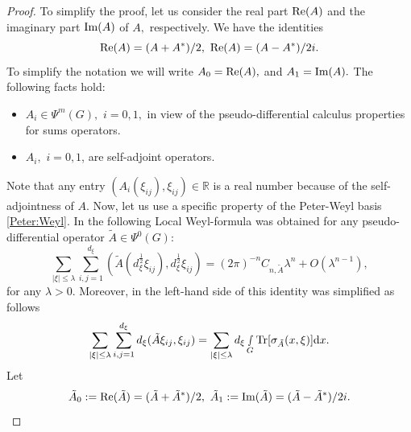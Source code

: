 \documentclass[12pt, reqno]{amsart}
\theoremstyle{definition}
\theoremstyle{remark}
\numberwithin{equation}{section}
\begin{document}
\begin{proof}
To simplify the proof, let us consider the real part $\textnormal{Re}(A)$ and the imaginary part $\textnormal{Im}(A)$ of $A,$ respectively. We have the identities
 \begin{equation}
        \textnormal{Re}(A)=(A+A^{*})/2,\,\,\textnormal{Re}(A)=(A-A^{*})/2i.
    \end{equation}To simplify the notation we will write $A_{0}=\textnormal{Re}(A),$ and  $A_{1}=\textnormal{Im}(A).$ 
The following facts hold:
\begin{itemize}
    \item $A_{i}\in \Psi^m(G),$ $i=0,1,$ in view of the pseudo-differential calculus properties for sums operators.
    \item $A_{i},$ $i=0,1$, are self-adjoint operators.
\end{itemize}Note that any entry $(A_{i}(\xi_{ij}),\xi_{ij})\in \mathbb{R
}$ is a real number because of the self-adjointness of $A.$ Now, let us use a specific property of the Peter-Weyl basis \eqref{Peter:Weyl}. 
In \cite{CardonaDelgadoRuzhanksyLOcalWeyl}
the following Local Weyl-formula was obtained for any pseudo-differential operator $\tilde{A}\in \Psi^0(G):$
\begin{equation}\label{Preliminary:formula}
  \sum_{|\xi|\leq \lambda}  \sum_{i,j=1}^{d_\xi}(\tilde{A}(d_\xi^{\frac{1}{2}}\xi_{ij}),d_\xi^{\frac{1}{2}}\xi_{ij})= (2\pi)^{-n}C_{n,\tilde A}\lambda^n+O(\lambda^{n-1}),
\end{equation}for any $\lambda>0.$ Moreover, in \cite{CardonaDelgadoRuzhanksyLOcalWeyl} the left-hand side of this identity was simplified as follows
\begin{equation}\label{equality}
    \sum_{|\xi|\leq \lambda}  \sum_{i,j=1}^{d_\xi}d_\xi(\tilde A\xi_{ij},\xi_{ij})=  \sum_{|\xi|\leq \lambda}d_\xi\smallint\limits_{G}\textnormal{Tr}[\sigma_{\tilde A}(x,\xi)]\textnormal{d}x.
\end{equation}Let \begin{equation}
       \tilde A_{0}:= \textnormal{Re}(\tilde A)=(\tilde A+{\tilde A}^{*})/2,\,\,\tilde A_{1}:=\textnormal{Im}(\tilde A)=(\tilde A-{\tilde A}^{*})/2i.
    \end{equation}


\end{proof}
\end{document}
